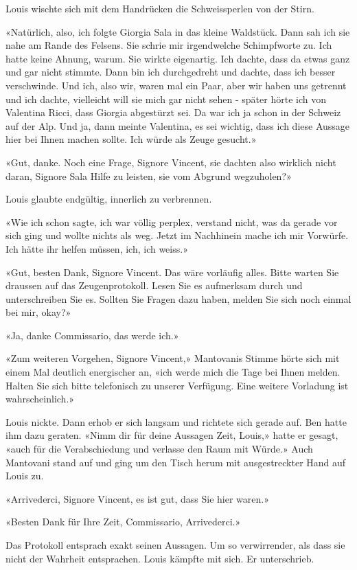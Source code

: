 Louis wischte sich mit dem Handrücken die Schweissperlen von der Stirn.

«Natürlich, also, ich folgte Giorgia Sala in das kleine Waldstück. Dann
sah ich sie nahe am Rande des Felsens. Sie schrie mir irgendwelche
Schimpfworte zu. Ich hatte keine Ahnung, warum. Sie
wirkte eigenartig. Ich dachte, dass da etwas ganz und gar nicht stimmte. Dann bin ich
durchgedreht und dachte, dass ich besser verschwinde. Und ich, also wir, waren mal ein Paar, aber wir haben uns getrennt und ich dachte, vielleicht will sie mich gar nicht sehen - später hörte ich
von Valentina Ricci, dass Giorgia abgestürzt sei. Da war ich ja schon in
der Schweiz auf der Alp. Und ja, dann meinte Valentina, es sei wichtig,
dass ich diese Aussage hier bei Ihnen machen sollte. Ich würde als Zeuge
gesucht.»

«Gut, danke. Noch eine Frage, Signore Vincent, sie dachten also wirklich nicht daran, Signore Sala Hilfe zu leisten,
sie vom Abgrund wegzuholen?»

Louis glaubte endgültig, innerlich zu verbrennen.

«Wie ich schon sagte, ich war völlig perplex, verstand nicht, was da
gerade vor sich ging und wollte nichts als weg. Jetzt im Nachhinein
mache ich mir Vorwürfe. Ich hätte ihr helfen müssen, ich, ich weiss.»

«Gut, besten Dank, Signore Vincent. Das wäre vorläufig alles. Bitte
warten Sie draussen auf das Zeugenprotokoll. Lesen Sie es aufmerksam
durch und unterschreiben Sie es. Sollten Sie Fragen dazu haben, melden
Sie sich noch einmal bei mir, okay?»

«Ja, danke Commissario, das werde ich.»

«Zum weiteren Vorgehen, Signore Vincent,» Mantovanis Stimme hörte sich
mit einem Mal deutlich energischer an, «ich werde mich die Tage bei
Ihnen melden. Halten Sie sich bitte telefonisch zu unserer Verfügung.
Eine weitere Vorladung ist wahrscheinlich.»

Louis nickte. Dann erhob er sich langsam und richtete sich gerade auf. Ben hatte ihm dazu geraten. «Nimm dir für deine Aussagen Zeit, Louis,» hatte er gesagt, «auch für die Verabschiedung und verlasse den Raum mit Würde.»
Auch Mantovani stand auf und ging um den Tisch herum mit ausgestreckter Hand auf Louis zu.

«Arrivederci, Signore Vincent, es ist gut, dass Sie hier waren.»

«Besten Dank für Ihre Zeit, Commissario, Arrivederci.»

Das Protokoll entsprach exakt seinen Aussagen. Um so verwirrender, als dass sie nicht der Wahrheit entsprachen. Louis kämpfte mit sich. Er unterschrieb.

